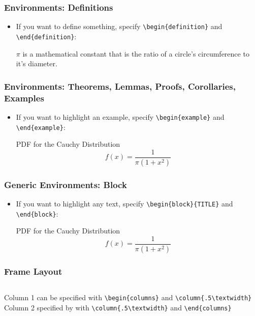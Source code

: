 \documentclass{beamer}
\begin{document}
\begin{frame}[fragile]
  \frametitle{Environments: Definitions}
  \begin{itemize}
  \item If you want to define something, specify \verb|\begin{definition}| and \verb|\end{definition}|:
  \begin{definition}
  $\pi$ is a mathematical constant that is the ratio of a circle's circumference to it's diameter.
  \end{definition}
  \end{itemize}
\end{frame}

\begin{frame}[fragile]
  \frametitle{Environments: Theorems, Lemmas, Proofs, Corollaries, Examples}
  \begin{itemize}
  \item If you want to highlight an example, specify \verb|\begin{example}| and \verb|\end{example}|:
  \begin{example}{PDF for the Cauchy Distribution}
  \[f(x)= \frac{1}{\pi(1+x^{2})}\]
  \end{example}
  \end{itemize}
\end{frame}

\begin{frame}[fragile]
  \frametitle{Generic Environments: Block}
  \begin{itemize}
  \item If you want to highlight any text, specify \verb|\begin{block}{TITLE}| and \verb|\end{block}|:
  \begin{block}{PDF for the Cauchy Distribution}
  \[f(x)= \frac{1}{\pi(1+x^{2})}\]
  \end{block}
  \end{itemize}
\end{frame}

\begin{frame}[fragile]
  \frametitle{Frame Layout}
  \begin{columns}
  Column 1 can be specified with \verb|\begin{columns}| and \verb|\column{.5\textwidth}|
  Column 2 specified by with \verb|\column{.5\textwidth}| and \verb|\end{columns}|
  \end{columns}
\end{frame}
\end{document}
